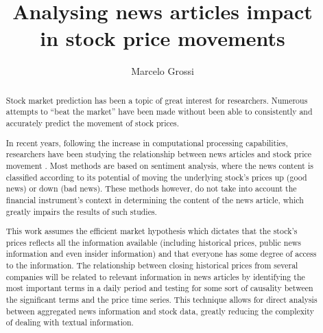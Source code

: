 \documentclass{article}
\title{Analysing news articles impact \\ in stock price movements}
\author{Marcelo Grossi}
\begin{document}
\maketitle

\begin{abstract}
Stock market prediction has been a topic of great interest for researchers. Numerous attempts to ``beat the market'' have been made without been able to consistently and accurately predict the movement of stock prices.
\par
In recent years, following the increase in computational processing capabilities, researchers have been studying the relationship between news articles and stock price movement \citep{Fu2008,Schumaker2009}. Most methods are based on sentiment analysis, where the news content is classified according to its potential of moving the underlying stock's prices up (good news) or down (bad news). These methods however, do not take into account the financial instrument's context in determining the content of the news article, which greatly impairs the results of such studies.
\par
This work assumes the efficient market hypothesis which dictates that the stock's prices reflects all the information available (including historical prices, public news information and even insider information) \citep{fama1965behavior} and that everyone has some degree of access to the information. The relationship between closing historical prices from several companies will be related to relevant information in news articles by identifying the most important terms in a daily period and testing for some sort of causality between the significant terms and the price time series. This technique allows for direct analysis between aggregated news information and stock data, greatly reducing the complexity of dealing with textual information.
\end{abstract}
\end{document}
